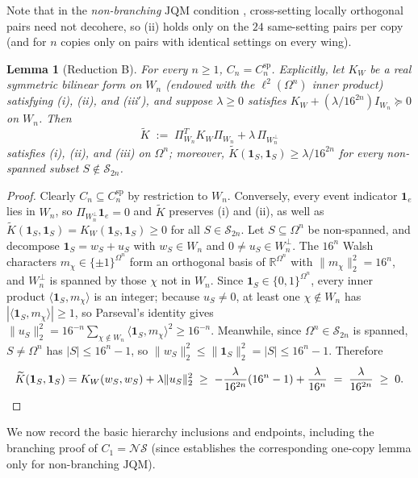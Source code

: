 \documentclass[11pt,a4paper]{article}
\newtheorem{lemma}[theorem]{Lemma}
\theoremstyle{definition}
\theoremstyle{remark}
\newcommand{\ind}[1]{\mathbf{1}_{#1}}
\newcommand{\JQM}{\mathrm{JQM}}
\newcommand{\NS}{\mathcal{NS}}
\begin{document}
Note that in the \emph{non-branching} $\JQM$ condition \cite[Sec.~4]{DHW}, cross-setting locally orthogonal pairs need not decohere, so (ii) holds only on the $24$ same-setting pairs per copy (and for $n$ copies only on pairs with identical settings on every wing).

\begin{lemma}[Reduction B]\label{l:redB}
For every $n \ge 1$, $C_n = C_n^{\mathrm{sp}}$. Explicitly, let $K_W$ be a real symmetric bilinear form on $W_n$ (endowed with the $\ell^2(\Omega^n)$ inner product) satisfying (i), (ii), and (iii$'$), and suppose $\lambda \ge 0$ satisfies $K_W + (\lambda / 16^{2n}) I_{W_n} \succeq 0$ on $W_n$. Then
\[
  \widetilde{K} \;:=\; \Pi_{W_n}^T K_W \Pi_{W_n} + \lambda\, \Pi_{W_n^\perp}
\]
satisfies (i), (ii), and (iii) on $\Omega^n$; moreover, $\widetilde{K}(\ind S, \ind S) \ge \lambda / 16^{2n}$ for every non-spanned subset $S \notin \mathcal{S}_{2n}$.
\end{lemma}

\begin{proof}
Clearly $C_n \subseteq C_n^{\mathrm{sp}}$ by restriction to $W_n$. Conversely, every event indicator $\ind e$ lies in $W_n$, so $\Pi_{W_n^\perp} \ind e = 0$ and $\widetilde{K}$ preserves (i) and (ii), as well as $\widetilde{K}(\ind S, \ind S) = K_W(\ind S, \ind S) \ge 0$ for all $S \in \mathcal{S}_{2n}$. Let $S \subseteq \Omega^n$ be non-spanned, and decompose $\ind S = w_S + u_S$ with $w_S \in W_n$ and $0 \neq u_S \in W_n^\perp$. The $16^n$ Walsh characters $m_\chi \in \{\pm 1\}^{\Omega^n}$ form an orthogonal basis of $\mathbb{R}^{\Omega^n}$ with $\|m_\chi\|_2^2 = 16^n$, and $W_n^\perp$ is spanned by those $\chi$ not in $W_n$. Since $\ind S \in \{0,1\}^{\Omega^n}$, every inner product $\langle \ind S, m_\chi \rangle$ is an integer; because $u_S \neq 0$, at least one $\chi \notin W_n$ has $|\langle \ind S, m_\chi \rangle| \ge 1$, so Parseval's identity gives $\|u_S\|_2^2 = 16^{-n} \sum_{\chi \notin W_n} \langle \ind S, m_\chi \rangle^2 \ge 16^{-n}$. Meanwhile, since $\Omega^n \in \mathcal{S}_{2n}$ is spanned, $S \neq \Omega^n$ has $|S| \le 16^n - 1$, so $\|w_S\|_2^2 \le \|\ind S\|_2^2 = |S| \le 16^n - 1$. Therefore
\[
  \widetilde{K}(\ind S, \ind S) = K_W(w_S, w_S) + \lambda \|u_S\|_2^2 \;\ge\; -\frac{\lambda}{16^{2n}}(16^n - 1) + \frac{\lambda}{16^n} \;=\; \frac{\lambda}{16^{2n}} \;\ge\; 0. \qedhere
\]
\end{proof}

We now record the basic hierarchy inclusions and endpoints, including the branching proof of $C_1 = \NS$ (since \cite[Sec.~5]{DHW} establishes the corresponding one-copy lemma only for non-branching $\JQM$).
\end{document}
